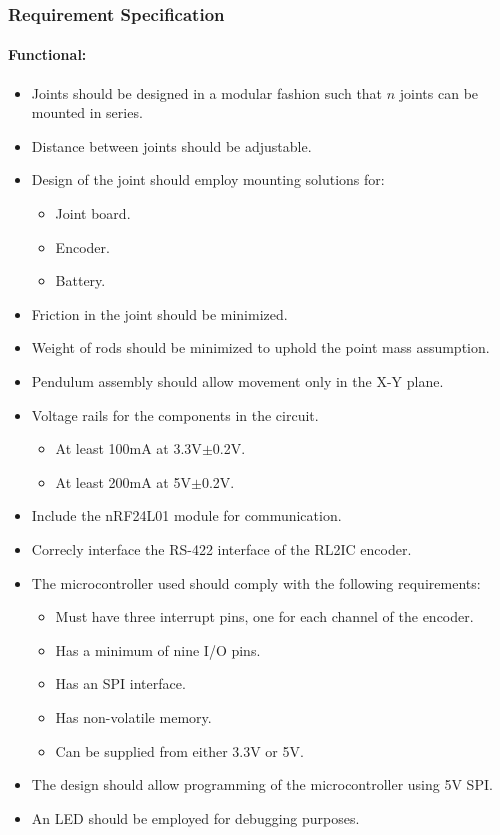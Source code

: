 \subsubsection{Requirement Specification}
\label{subs:joint_requirements}

\paragraph{Functional:}
\begin{itemize}
	\item Joints should be designed in a modular fashion such that $n$ joints can be mounted in series.
	\item Distance between joints should be adjustable.
	\item Design of the joint should employ mounting solutions for:
	\begin{itemize}
		\item Joint board.
		\item Encoder.
		\item Battery. 
	\end{itemize}
	\item Friction in the joint should be minimized.
	\item Weight of rods should be minimized to uphold the point mass assumption.
	\item Pendulum assembly should allow movement only in the X-Y plane. 

	\item Voltage rails for the components in the circuit.
	\begin{itemize}
		\item At least 100mA at 3.3V$\pm$0.2V.
		\item At least 200mA at 5V$\pm$0.2V.
	\end{itemize}

	\item Include the nRF24L01 module for communication.
	\item Correcly interface the RS-422 interface of the RL2IC encoder.

	\item  The microcontroller used should comply with the following requirements:
	\begin{itemize}
		\item Must have three interrupt pins, one for each channel of the encoder.
		\item Has a minimum of nine I/O pins.
		\item Has an SPI interface.
		\item Has non-volatile memory.
		\item Can be supplied from either 3.3V or 5V.
	\end{itemize}
	\item The design should allow programming of the microcontroller using 5V SPI.
	\item An LED should be employed for debugging purposes.
\end{itemize}


